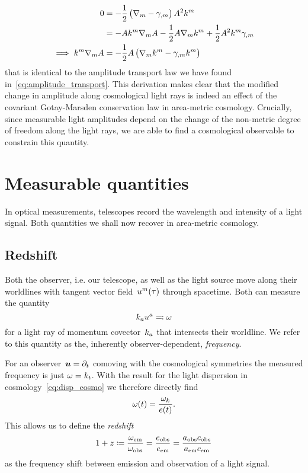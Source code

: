 \begin{align}
	0&=-\frac{1}{2}\left(\nabla_m-\gamma_{,m}\right)A^2k^m \\
	&=-Ak^m\nabla_mA-\frac{1}{2}A\nabla_mk^m+\frac{1}{2}A^2k^m\gamma_{,m} \\
	\implies k^m\nabla_mA &=-\frac{1}{2}A\left(\nabla_mk^m-\gamma_{,m}k^m\right)\label{eq:light_cons}
\end{align}
that is identical to the amplitude transport law we have found in~\eqref{eq:amplitude_transport}. This derivation makes clear that the modified change in amplitude along cosmological light rays is indeed an effect of the covariant Gotay-Marsden conservation law in area-metric cosmology. Crucially, since measurable light amplitudes depend on the change of the non-metric degree of freedom along the light rays, we are able to find a cosmological observable to constrain this quantity.



\section{Measurable quantities}

In optical measurements, telescopes record the wavelength and intensity of a light signal. Both quantities we shall now recover in area-metric cosmology.

\subsection{Redshift}

Both the observer, i.e. our telescope, as well as the light source move along their worldlines with tangent vector field~$u^m(\tau)$ through spacetime. Both can measure the quantity
\begin{equation}
	k_au^a\eqqcolon\omega
\end{equation}
for a light ray of momentum covector~$k_a$ that intersects their worldline. We refer to this quantity as the, inherently observer-dependent, \emph{frequency}.

For an observer~$\boldsymbol{u}=\partial_t$ comoving with the cosmological symmetries the measured frequency is just $\omega=k_t$. With the result for the light dispersion in cosmology~\eqref{eq:disp_cosmo} we therefore directly find
\begin{equation}
	\omega(t)=\frac{\omega_k}{e(t)}
	\mathpunct{.}
\end{equation}
This allows us to define the \emph{redshift}
\begin{equation}
	1+z\coloneqq\frac{\omega_{\mathrm{em}}}{\omega_{\mathrm{obs}}}=\frac{e_{\mathrm{obs}}}{e_{\mathrm{em}}}=\frac{a_{\mathrm{obs}}c_{\mathrm{obs}}}{a_{\mathrm{em}}c_{\mathrm{em}}}
\end{equation}
as the frequency shift between emission and observation of a light signal.

